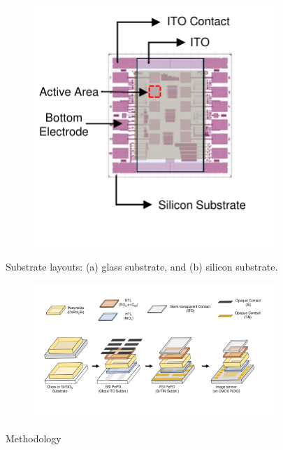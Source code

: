 \begin{figure}[htbp]
\begin{subfigure}[t]{0.49\textwidth}
        \includegraphics[width=\textwidth]{chapters/material_properties/images/PIX_Substrate.pdf} %
        \caption{}
        \label{fig:ch2:pix_substrate}
    \end{subfigure}

    \caption{Substrate layouts: (a) glass substrate, and (b) silicon substrate.}
    \label{fig:ch2:types_of_substrates}
\end{figure}

\begin{figure}[htbp]
    \centering
    \begin{subfigure}[t]{0.99\textwidth} %
        \centering
        \includegraphics[width=\textwidth]{chapters/material_properties/images/methodology.pdf} %
        \caption{}
        \label{fig:ch2:glass_substrate}
    \end{subfigure}

    \caption{Methodology}
    \label{fig:ch2:methodology}
\end{figure}


